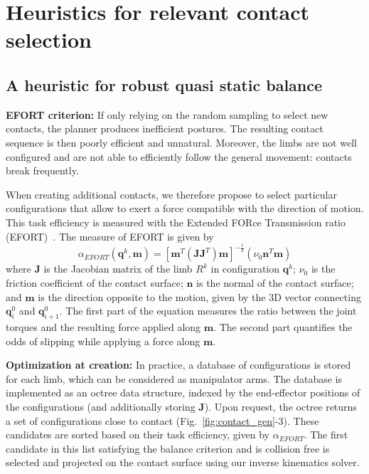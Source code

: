 \section{Heuristics for relevant contact selection}

\subsection{A heuristic for robust quasi static balance}
\noindent\textbf{EFORT criterion:} If only relying on the random sampling to select new contacts, the planner produces inefficient postures. The resulting contact sequence is then poorly efficient and unnatural. Moreover, the limbs are not well configured and are not able to efficiently follow the general movement: contacts break frequently.

When creating additional contacts, we therefore propose to select particular configurations that allow to exert a force compatible with the direction of motion. This task efficiency is measured  with the Extended FORce Transmission ratio (EFORT)~\cite{Tonneau2014}.
%
The measure of EFORT is given by
\begin{equation}
\alpha_{EFORT}(\mathbf{q}^k, \mathbf{m}) = [\mathbf{m}^{T}(\mathbf{J}\mathbf{J}^T)\mathbf{m}]^{-\frac{1}{2}} ( \nu_0 \mathbf{n}^T \mathbf{m})
\end{equation}
where $\mathbf{J}$ is the Jacobian matrix of the limb $R^k$ in configuration $\mathbf{q}^k$; $\nu_0$ is the friction coefficient of the contact surface; $\mathbf{n}$ is the normal of the contact surface; and $\mathbf{m}$ is the direction opposite to the motion,
given by the 3D vector connecting $\mathbf{q}_{i}^0$ and $\mathbf{q}_{i+1}^0$.
%
The first part of the equation measures the ratio between the joint  torques and the resulting force applied along $\mathbf{m}$. The second part quantifies the odds of slipping while applying a force along $\mathbf{m}$. 

\noindent\textbf{Optimization at creation:} In practice, a database of configurations is stored for each limb, which can be considered as manipulator arms. The database is implemented  as an octree data structure, indexed by the end-effector positions of the configurations (and additionally storing $\mathbf{J}$). 
Upon request, the octree returns a set of configurations close to contact (Fig.~\ref{fig:contact_gen}-3). These candidates are sorted based on their task efficiency, given by $\alpha_{EFORT}$. The first candidate in this list satisfying the balance criterion and is collision free is selected and projected on the contact surface using our inverse kinematics solver.



